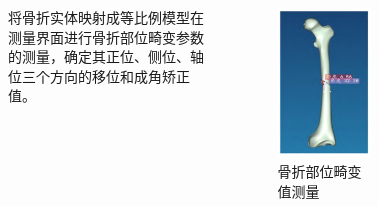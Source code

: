\documentclass[notheorems, aspectratio=54]{beamer}
\begin{document}
\begin{frame}
\begin{columns}
    将骨折实体映射成等比例模型在测量界面进行骨折部位畸变参数的测量，确定其正位、侧位、轴位三个方向的移位和成角矫正值。
    \begin{figure}[htbp]
		\centering
		\includegraphics[scale=0.4]{figure4.png}
		\caption{骨折部位畸变值测量}
		\label{figure 4}
	\end{figure}
	\begin{figure}[htbp]
		\centering

\end{figure}
\end{columns}
\end{frame}
\end{document}
